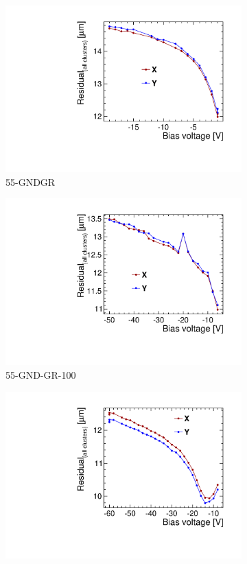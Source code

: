 \begin{figure}[htbp]
  \begin{subfigure}[b]{0.33\textwidth}
    \includegraphics[width=\textwidth]{./figures/TestBeam/W19_C7_Residual_vs_bias.pdf}
    \caption{55-GNDGR}
  \end{subfigure} \hfill
  \begin{subfigure}[b]{0.33\textwidth}
    \includegraphics[width=\textwidth]{./figures/TestBeam/W5_E2_Residual_vs_bias.pdf}
    \caption{55-GND-GR-100}
  \end{subfigure}\hfill
  \begin{subfigure}[b]{0.33\textwidth}
    \includegraphics[width=\textwidth]{./figures/TestBeam/W5_F1_Residual_vs_bias.pdf}

\end{subfigure}
\end{figure}
